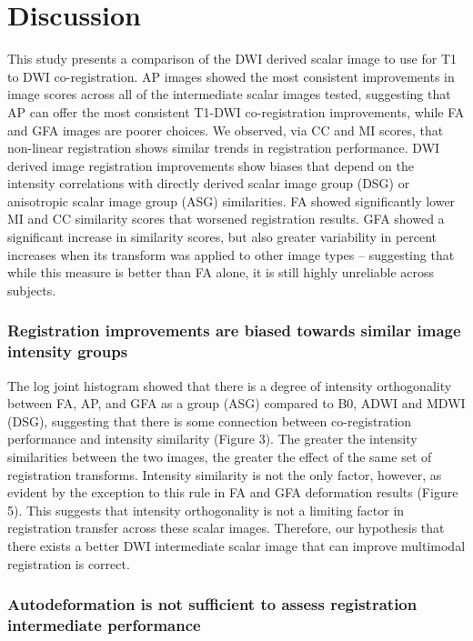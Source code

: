 \section{Discussion}

This study presents a comparison of the DWI derived scalar image to use for T1 to DWI co-registration. AP images showed the most consistent improvements in image scores across all of the intermediate scalar images tested, suggesting that AP can offer the most consistent T1-DWI co-registration improvements, while FA and GFA images are poorer choices. We observed, via CC and MI scores, that non-linear registration shows similar trends in registration performance. DWI derived image registration improvements show biases that depend on the intensity correlations with directly derived scalar image group (DSG) or anisotropic scalar image group (ASG) similarities. FA showed significantly lower MI and CC similarity scores that worsened registration results. GFA showed a significant increase in similarity scores, but also greater variability in percent increases when its transform was applied to other image types – suggesting that while this measure is better than FA alone, it is still highly unreliable across subjects. 

\subsubsection{Registration improvements are biased towards similar image intensity groups}

The log joint histogram showed that there is a degree of intensity orthogonality between FA, AP, and GFA as a group (ASG) compared to B0, ADWI and MDWI (DSG), suggesting that there is some connection between co-registration performance and intensity similarity (Figure 3). The greater the intensity similarities between the two images, the greater the effect of the same set of registration transforms. Intensity similarity is not the only factor, however, as evident by the exception to this rule in FA and GFA deformation results (Figure 5). This suggests that intensity orthogonality is not a limiting factor in registration transfer across these scalar images. Therefore, our hypothesis that there exists a better DWI intermediate scalar image that can improve multimodal registration is correct.

\subsubsection{Autodeformation is not sufficient to assess registration intermediate performance}

